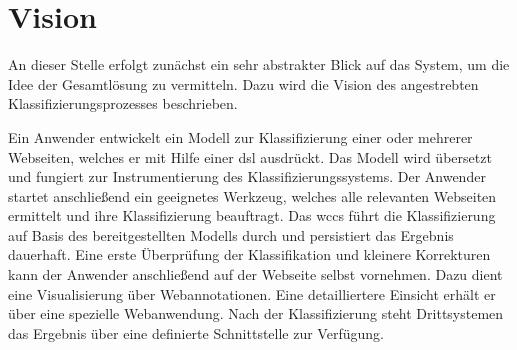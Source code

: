 \section{Vision}
    An dieser Stelle erfolgt zunächst ein sehr abstrakter Blick auf das System,
    um die Idee der Gesamtlösung zu vermitteln.
    Dazu wird die Vision des angestrebten Klassifizierungsprozesses beschrieben.

    Ein Anwender entwickelt ein Modell zur Klassifizierung einer oder mehrerer Webseiten,
    welches er mit Hilfe einer \gls{dsl} ausdrückt.
    Das Modell wird übersetzt und fungiert zur Instrumentierung des Klassifizierungssystems.
    Der Anwender startet anschließend ein geeignetes Werkzeug,
    welches alle relevanten Webseiten ermittelt und ihre Klassifizierung beauftragt.
    Das \gls{wccs} führt die Klassifizierung auf Basis des bereitgestellten Modells durch
    und persistiert das Ergebnis dauerhaft.
    Eine erste Überprüfung der Klassifikation und kleinere Korrekturen kann der Anwender anschließend auf der
    Webseite selbst vornehmen.
    Dazu dient eine Visualisierung über Webannotationen.
    Eine detailliertere Einsicht erhält er über eine spezielle Webanwendung.
    Nach der Klassifizierung steht Drittsystemen das Ergebnis über eine definierte Schnittstelle
    zur Verfügung.
